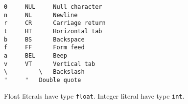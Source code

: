 \begin{lstlisting}
0     NUL     Null character
n     NL      Newline
r     CR      Carriage return
t     HT      Horizontal tab
b     BS      Backspace
f     FF      Form feed
a     BEL     Beep
v     VT      Vertical tab
\         \   Backslash
"     "   Double quote
\end{lstlisting}

Float literals have type \passthrough{\lstinline!float!}. Integer
literal have type \passthrough{\lstinline!int!}.


